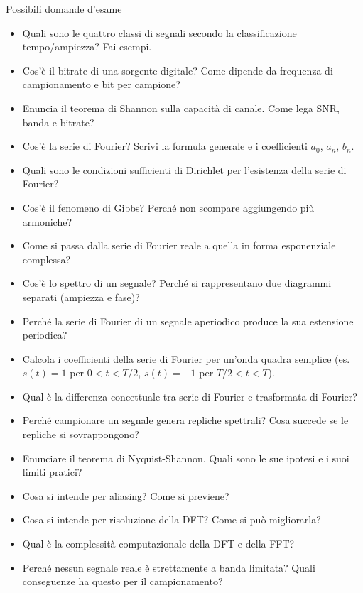 \documentclass[
  italian,
  openany]{book}
\providecommand{\tightlist}{%
  \setlength{\itemsep}{0pt}\setlength{\parskip}{0pt}}
\begin{document}
\begin{calloutquestion}{Possibili domande d’esame}

\begin{itemize}
\tightlist
\item
  Quali sono le quattro classi di segnali secondo la classificazione
  tempo/ampiezza? Fai esempi.
\item
  Cos'è il bitrate di una sorgente digitale? Come dipende da frequenza
  di campionamento e bit per campione?
\item
  Enuncia il teorema di Shannon sulla capacità di canale. Come lega SNR,
  banda e bitrate?
\item
  Cos'è la serie di Fourier? Scrivi la formula generale e i coefficienti
  \(a_0\), \(a_n\), \(b_n\).
\item
  Quali sono le condizioni sufficienti di Dirichlet per l'esistenza
  della serie di Fourier?
\item
  Cos'è il fenomeno di Gibbs? Perché non scompare aggiungendo più
  armoniche?
\item
  Come si passa dalla serie di Fourier reale a quella in forma
  esponenziale complessa?
\item
  Cos'è lo spettro di un segnale? Perché si rappresentano due diagrammi
  separati (ampiezza e fase)?
\item
  Perché la serie di Fourier di un segnale aperiodico produce la sua
  estensione periodica?
\item
  Calcola i coefficienti della serie di Fourier per un'onda quadra
  semplice (es. \(s(t) = 1\) per \(0 < t < T/2\), \(s(t) = -1\) per
  \(T/2 < t < T\)).
\item
  Qual è la differenza concettuale tra serie di Fourier e trasformata di
  Fourier?
\item
  Perché campionare un segnale genera repliche spettrali? Cosa succede
  se le repliche si sovrappongono?
\item
  Enunciare il teorema di Nyquist-Shannon. Quali sono le sue ipotesi e i
  suoi limiti pratici?
\item
  Cosa si intende per aliasing? Come si previene?
\item
  Cosa si intende per risoluzione della DFT? Come si può migliorarla?
\item
  Qual è la complessità computazionale della DFT e della FFT?
\item
  Perché nessun segnale reale è strettamente a banda limitata? Quali
  conseguenze ha questo per il campionamento?
\end{itemize}

\end{calloutquestion}
\end{document}
